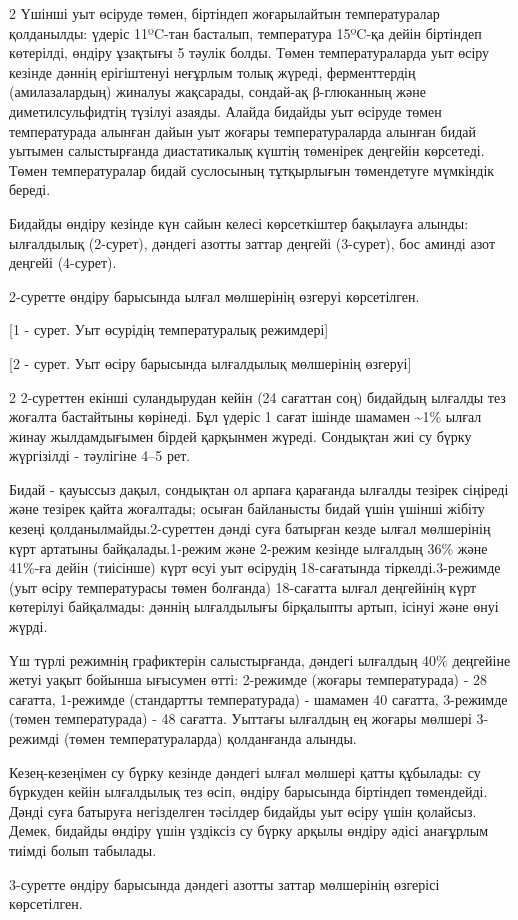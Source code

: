 \begin{multicols}{2}
Үшінші уыт өсіруде төмен, біртіндеп жоғарылайтын температуралар
қолданылды: үдеріс 11ºC-тан басталып, температура 15ºC-қа дейін
біртіндеп көтерілді, өндіру ұзақтығы 5 тәулік болды. Төмен
температураларда уыт өсіру кезінде дәннің ерігіштенуі неғұрлым толық
жүреді, ферменттердің (амилазалардың) жиналуы жақсарады, сондай-ақ
β-глюканның және диметилсульфидтің түзілуі азаяды. Алайда бидайды уыт
өсіруде төмен температурада алынған дайын уыт жоғары температураларда
алынған бидай уытымен салыстырғанда диастатикалық күштің төменірек
деңгейін көрсетеді. Төмен температуралар бидай суслосының тұтқырлығын
төмендетуге мүмкіндік береді.

Бидайды өндіру кезінде күн сайын келесі көрсеткіштер бақылауға алынды:
ылғалдылық (2-сурет), дәндегі азотты заттар деңгейі (3-сурет), бос
аминді азот деңгейі (4-сурет).

2-суретте өндіру барысында ылғал мөлшерінің өзгеруі көрсетілген.
\end{multicols}

[1 - сурет. Уыт өсурідің температуралық
режимдері]

[2 - сурет. Уыт өсіру барысында
ылғалдылық мөлшерінің өзгеруі]

\begin{multicols}{2}
2-суреттен екінші суландырудан кейін (24 сағаттан соң) бидайдың ылғалды
тез жоғалта бастайтыны көрінеді. Бұл үдеріс 1 сағат ішінде шамамен
\textasciitilde1\% ылғал жинау жылдамдығымен бірдей қарқынмен жүреді.
Сондықтан жиі су бүрку жүргізілді - тәулігіне 4--5 рет.

Бидай - қауыссыз дақыл, сондықтан ол арпаға қарағанда ылғалды тезірек
сіңіреді және тезірек қайта жоғалтады; осыған байланысты бидай үшін
үшінші жібіту кезеңі қолданылмайды.2-суреттен дәнді суға батырған кезде
ылғал мөлшерінің күрт артатыны байқалады.1-режим және 2-режим кезінде
ылғалдың 36\% және 41\%-ға дейін (тиісінше) күрт өсуі уыт өсірудің
18-сағатында тіркелді.3-режимде (уыт өсіру температурасы төмен
болғанда) 18-сағатта ылғал деңгейінің күрт көтерілуі байқалмады: дәннің
ылғалдылығы бірқалыпты артып, ісінуі және өнуі жүрді.

Үш түрлі режимнің графиктерін салыстырғанда, дәндегі ылғалдың 40\%
деңгейіне жетуі уақыт бойынша ығысумен өтті: 2-режимде (жоғары
температурада) - 28 сағатта, 1-режимде (стандартты температурада) -
шамамен 40 сағатта, 3-режимде (төмен температурада) - 48 сағатта.
Уыттағы ылғалдың ең жоғары мөлшері 3-режимді (төмен температураларда)
қолданғанда алынды.

Кезең-кезеңімен су бүрку кезінде дәндегі ылғал мөлшері қатты құбылады:
су бүркуден кейін ылғалдылық тез өсіп, өндіру барысында біртіндеп
төмендейді. Дәнді суға батыруға негізделген тәсілдер бидайды уыт өсіру
үшін қолайсыз. Демек, бидайды өндіру үшін үздіксіз су бүрку арқылы
өндіру әдісі анағұрлым тиімді болып табылады.

3-суретте өндіру барысында дәндегі азотты заттар мөлшерінің өзгерісі
көрсетілген.
\end{multicols}

